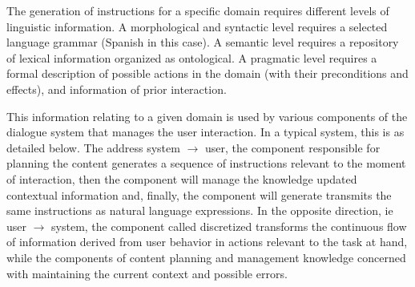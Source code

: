 
The generation of instructions for a specific domain requires different levels
of linguistic information. A morphological and syntactic level requires a
selected language grammar (Spanish in this case). A semantic level requires a
repository of lexical information organized as ontological. A pragmatic level
requires a formal description of possible actions in the domain (with their
preconditions and effects), and information of prior interaction.



This information relating to a given domain is used by various components of the
dialogue system that manages the user interaction. In a typical system, this is
as detailed below. The address system $\rightarrow$ user, the component
responsible for planning the content generates a sequence of instructions
relevant to the moment of interaction, then the component will manage the
knowledge updated contextual information and, finally, the component will
generate transmits the same instructions as natural language expressions. In the
opposite direction, ie user $\rightarrow$ system, the component called
discretized transforms the continuous flow of information derived from user
behavior in actions relevant to the task at hand, while the components of
content planning and management knowledge concerned with maintaining the current
context and possible errors.


